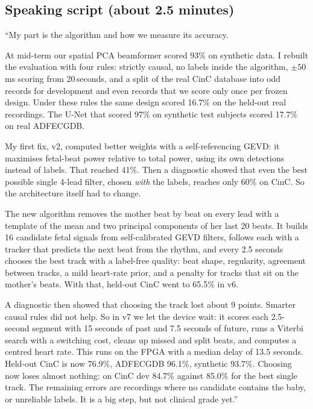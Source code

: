 \documentclass[11pt]{article}
\begin{document}
\subsection{Speaking script (about 2.5 minutes)}
\begin{lesson}
``My part is the algorithm and how we measure its accuracy.

At mid-term our spatial PCA beamformer scored 93\% on synthetic data. I rebuilt the evaluation with four rules: strictly causal, no labels inside the algorithm, $\pm 50$\,ms scoring from 20\,seconds, and a split of the real CinC database into odd records for development and even records that we score only once per frozen design. Under these rules the same design scored 16.7\% on the held-out real recordings. The U-Net that scored 97\% on synthetic test subjects scored 17.7\% on real ADFECGDB.

My first fix, v2, computed better weights with a self-referencing GEVD: it maximises fetal-beat power relative to total power, using its own detections instead of labels. That reached 41\%. Then a diagnostic showed that even the best possible single 4-lead filter, chosen \emph{with} the labels, reaches only 60\% on CinC. So the architecture itself had to change.

The new algorithm removes the mother beat by beat on every lead with a template of the mean and two principal components of her last 20 beats. It builds 16 candidate fetal signals from self-calibrated GEVD filters, follows each with a tracker that predicts the next beat from the rhythm, and every 2.5 seconds chooses the best track with a label-free quality: beat shape, regularity, agreement between tracks, a mild heart-rate prior, and a penalty for tracks that sit on the mother's beats. With that, held-out CinC went to 65.5\% in v6.

A diagnostic then showed that choosing the track lost about 9 points. Smarter causal rules did not help. So in v7 we let the device wait: it scores each 2.5-second segment with 15 seconds of past and 7.5 seconds of future, runs a Viterbi search with a switching cost, cleans up missed and split beats, and computes a centred heart rate. This runs on the FPGA with a median delay of 13.5 seconds. Held-out CinC is now 76.9\%, ADFECGDB 96.1\%, synthetic 93.7\%. Choosing now loses almost nothing: on CinC dev 84.7\% against 85.0\% for the best single track. The remaining errors are recordings where no candidate contains the baby, or unreliable labels. It is a big step, but not clinical grade yet.''
\end{lesson}
\end{document}
